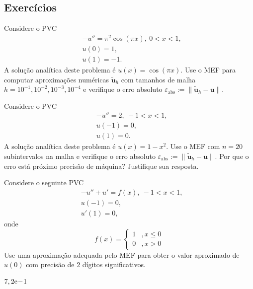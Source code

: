 \subsection{Exercícios}

\begin{exer}
  Considere o PVC
  \begin{align}
    &-u'' = \pi^2\cos(\pi x), ~0 < x < 1,\\
    &u(0) = 1,\\
    &u(1) = -1.
  \end{align}
  A solução analítica deste problema é $u(x) = \cos(\pi x)$. Use o MEF para computar aproximações numéricas $\tilde{\pmb{u}}_h$ com tamanhos de malha $h=10^{-1}, 10^{-2}, 10^{-3}, 10^{-4}$ e verifique o erro absoluto $\varepsilon_{\text{abs}} := \|\tilde{\pmb{u}}_h - \pmb{u}\|$.
\end{exer}

\begin{exer}
  Considere o PVC
  \begin{align}
    &-u'' = 2, ~-1 < x < 1,\\
    &u(-1) = 0,\\
    &u(1) = 0.
  \end{align}
  A solução analítica deste problema é $u(x) = 1-x^2$. Use o MEF com $n=20$ subintervalos na malha e verifique o erro absoluto $\varepsilon_{\text{abs}} := \|\tilde{\pmb{u}}_h - \pmb{u}\|$. Por que o erro está próximo precisão de máquina? Justifique sua resposta.
\end{exer}

\begin{exer}
Considere o seguinte PVC
\begin{subequations}
  \begin{align}
    &-u'' + u' = f(x), ~-1 < x < 1,\\
    &u(-1) = 0,\\
    &u'(1) =0,
  \end{align}
\end{subequations}
onde
\begin{equation}
  f(x) = \left\{
    \begin{array}{ll}
      1 &, x\leq 0\\
      0 &, x>0
    \end{array}
  \right.
\end{equation}
Use uma aproximação adequada pelo MEF para obter o valor aproximado de $u(0)$ com precisão de $2$ dígitos significativos.
\end{exer}
\begin{resp}
  $7,2\mathrm{e}\!-\!1$
\end{resp}


